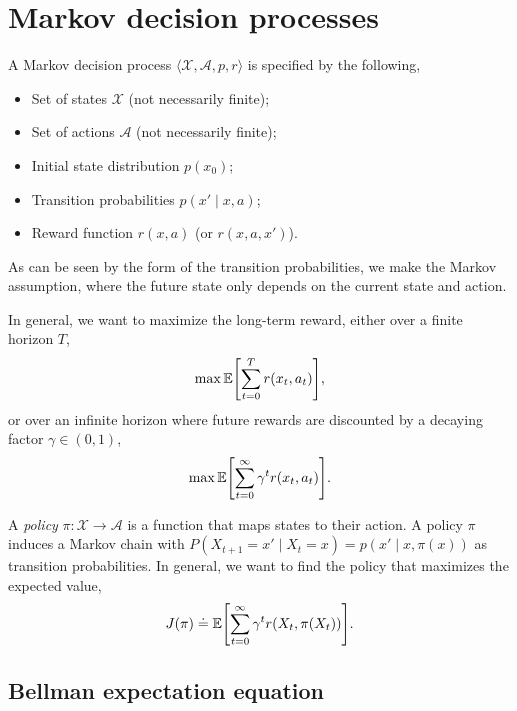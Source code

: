 \section{Markov decision processes} \label{sec:mdp}


\begin{definition}
  A Markov decision process $\langle \mathcal{X},\mathcal{A},p,r \rangle$ is
  specified by the following,
  \begin{itemize}
    \item Set of states $\mathcal{X}$ (not necessarily finite);
    \item Set of actions $\mathcal{A}$ (not necessarily finite);
    \item Initial state distribution $p(x_0)$;
    \item Transition probabilities $p(x'\mid x, a)$;
    \item Reward function $r(x, a)$ (or $r(x,a,x')$).
  \end{itemize}
  As can be seen by the form of the transition probabilities, we make the
  Markov assumption, where the future state only depends on the current state
  and action.
\end{definition}

In general, we want to maximize the long-term reward, either over a finite
horizon $T$, \[
  \max \E \lft[ \sum_{t=0}^T r(x_t,a_t) \rgt]
,\]
or over an infinite horizon where future rewards are discounted by a decaying
factor $\gamma\in(0,1)$, \[
  \max \E \lft[ \sum_{t=0}^{\infty} \gamma^t r(x_t,a_t) \rgt]
.\]

A \textit{policy} $\pi : \mathcal{X} \to \mathcal{A}$ is a function that maps
states to their action. A policy $\pi$ induces a Markov chain with
$P(X_{t+1}=x' \mid X_t = x) = p(x' \mid x, \pi(x))$ as transition
probabilities. In general, we want to find the policy that maximizes the
expected value, \[
  J(\pi) \doteq \E \lft[ \sum_{t=0}^\infty \gamma^t r(X_t, \pi(X_t)) \rgt]
.\]

\subsection{Bellman expectation equation}


